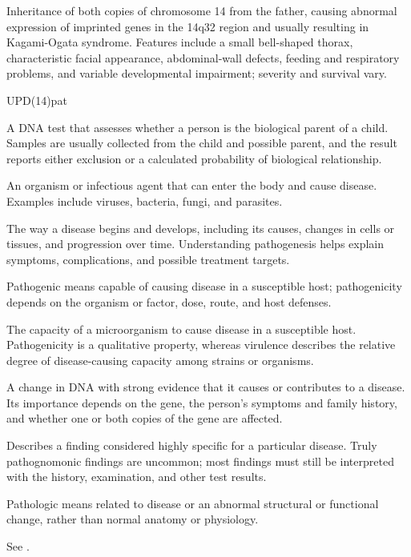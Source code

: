  Inheritance of both copies of chromosome 14 from the father, causing abnormal expression of imprinted genes in the 14q32 region and usually resulting in Kagami-Ogata syndrome. Features include a small bell-shaped thorax, characteristic facial appearance, abdominal-wall defects, feeding and respiratory problems, and variable developmental impairment; severity and survival vary.

\synonyms
UPD(14)pat

 A DNA test that assesses whether a person is the biological parent of a child. Samples are usually collected from the child and possible parent, and the result reports either exclusion or a calculated probability of biological relationship.

 An organism or infectious agent that can enter the body and cause disease. Examples include viruses, bacteria, fungi, and parasites.

 The way a disease begins and develops, including its causes, changes in cells or tissues, and progression over time. Understanding pathogenesis helps explain symptoms, complications, and possible treatment targets.

 Pathogenic means capable of causing disease in a susceptible host; pathogenicity depends on the organism or factor, dose, route, and host defenses.

 The capacity of a microorganism to cause disease in a susceptible host. Pathogenicity is
a qualitative property, whereas virulence describes the relative degree of
disease-causing capacity among strains or organisms.

 A change in DNA with strong evidence that it causes or contributes to a disease. Its importance depends on the gene, the person’s symptoms and family history, and whether one or both copies of the gene are affected.

 Describes a finding considered highly specific for a particular disease. Truly pathognomonic findings are uncommon; most findings must still be interpreted with the history, examination, and other test results.

 Pathologic means related to disease or an abnormal structural or functional change, rather than normal anatomy or physiology.

 See .

